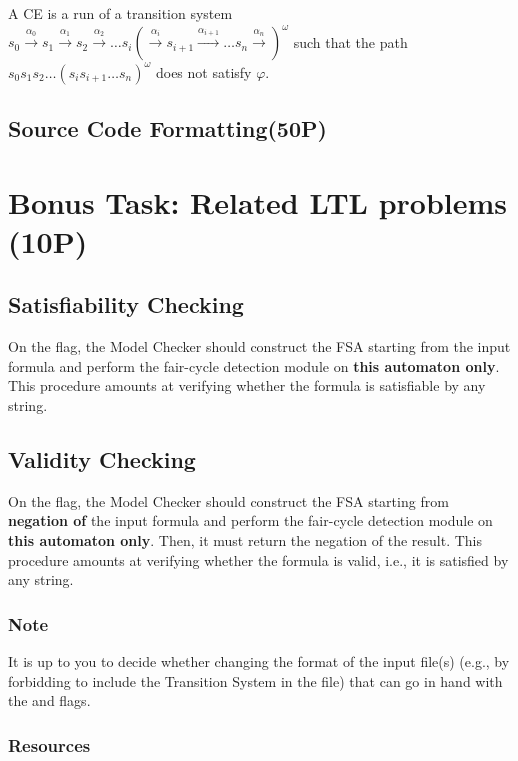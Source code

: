 \documentclass{article}
\begin{document}
A CE is a run of a transition system $s_0 \xrightarrow[]{\alpha_0} s_1 \xrightarrow[]{\alpha_1} s_2 \xrightarrow[]{\alpha_2} \dots s_i (\xrightarrow[]{\alpha_i} s_{i+1} \xrightarrow[]{\alpha_{i+1}} \dots s_n \xrightarrow[]{\alpha_n})^{\omega}$ such 
that the path $s_0s_1s_2 \dots (s_is_{i+1} \dots s_n )^{\omega}$ does not satisfy $\varphi$.

\subsection{Source Code Formatting(50P)}

\section{Bonus Task: Related LTL problems (10P)} \label{sec::bonus1}

\subsection{Satisfiability Checking}
On the  flag, the Model Checker should construct the FSA starting from the input formula
and perform the fair-cycle detection module on \textbf{this automaton only}. 
This procedure amounts at verifying whether the formula is satisfiable by any string. 

\subsection{Validity Checking}
On the  flag, the Model Checker should construct the FSA starting from \textbf{negation of} 
the input formula and perform the fair-cycle detection module on \textbf{this automaton only}. 
Then, it must return the negation of the result.
This procedure amounts at verifying whether the formula is valid, i.e., it is satisfied by any string. 

\subsubsection*{Note}
It is up to you to decide whether changing the format of the input file(s)
(e.g., by forbidding to include the Transition System in the file) 
that can go in hand with the  and  flags.

\subsubsection*{Resources}
\cite[Paragraph 5.2.2]{BaKa}
\end{document}
